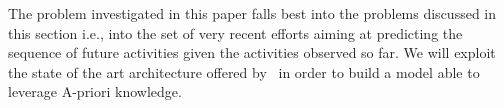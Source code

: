 
The problem investigated in this paper falls best into the problems discussed in this section i.e., into the set of very recent efforts aiming at predicting the sequence of future activities given the activities observed so far. We will exploit the state of the art architecture offered by~\cite{niek96732} in order to build a model able to leverage A-priori knowledge.



%
%
%


